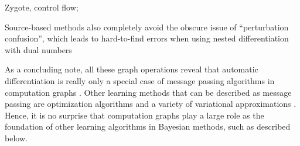 Zygote, control flow;



Source-based methods also completely avoid the obscure issue of \enquote{perturbation confusion},
which leads to hard-to-find errors when using nested differentiation with dual numbers
\parencite{baydin2018automatic,manzyuk2019perturbation}

As a concluding note, all these graph operations reveal that automatic differentiation is really
only a special case of message passing algorithms in computation graphs
\parencite{minka2019automatic}.  Other learning methods that can be described as message passing are
optimization algorithms \parencite{ruozzi2011message,dauwels2005steepest} and a variety of
variational approximations \parencite{winn2005variational,minka2005divergence}.  Hence, it is no
surprise that computation graphs play a large role as the foundation of other learning algorithms in
Bayesian methods, such as described below.

